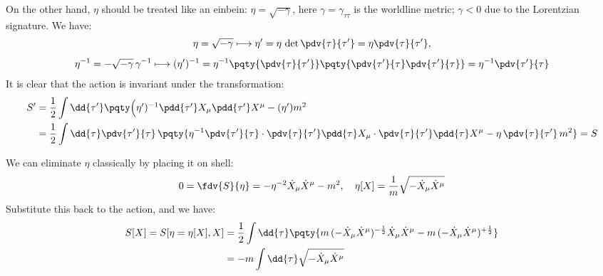 \documentclass[a4paper,10pt]{article}
\begin{document}
	On the other hand, $\eta$ should be treated like an einbein: $\eta = \sqrt{-\gamma}$, here $\gamma = \gamma_{\tau\tau}$ is the worldline metric; $\gamma < 0$ due to the Lorentzian signature. We have:
	\begin{gather}
		\eta = \sqrt{-\gamma}
		\longmapsto \eta' = \eta\,
			\det \pdv{\tau}{\tau'}
		= \eta \pdv{\tau}{\tau'},
	\\[1ex]
		\eta^{-1}
		= - \sqrt{-\gamma}\,\gamma^{-1}
		\longmapsto (\eta')^{-1} = \eta^{-1}
			\pqty{\pdv{\tau}{\tau'}}
			\pqty{
				\pdv{\tau'}{\tau}
				\pdv{\tau'}{\tau}
			}
		= \eta^{-1} \pdv{\tau'}{\tau}
	\end{gather}
	It is clear that the action is invariant under the transformation:
	\begin{equation}
	\begin{aligned}
		S'
		&= \frac{1}{2} \int \dd{\tau'} \pqty\Big{
				(\eta')^{-1}
					\pdd{\tau'} X_\mu
					\pdd{\tau'} X^\mu
				- (\eta') m^2
			} \\
		&= \frac{1}{2} \int \dd{\tau}
			\pdv{\tau'}{\tau}\,
			\pqty{
				\eta^{-1}
					\pdv{\tau'}{\tau}
					\cdot
					\pdv{\tau}{\tau'}
					\pdd{\tau} X_\mu
					\cdot
					\pdv{\tau}{\tau'}
					\pdd{\tau} X^\mu
				- \eta\,\pdv{\tau}{\tau'}\,m^2
			} = S
	\end{aligned}
	\end{equation}
	
	We can eliminate $\eta$ classically by placing it on shell:
	\begin{equation}
		0 = \fdv{S}{\eta}
		= - \eta^{-2} \dot{X}_\mu \dot{X}^\mu
			- m^2,
	\quad
		\eta[X] = \frac{1}{m}
			\sqrt{-\dot{X}_\mu \dot{X}^\mu}
	\end{equation}
	Substitute this back to the action, and we have:
	\begin{equation}
	\begin{aligned}
		S[X] = S[\eta = \eta[X], X]
		&= \frac{1}{2} \int \dd{\tau} \pqty{
				m\,(
					-\dot{X}_\mu \dot{X}^\mu
				)^{-\frac{1}{2}}
				\dot{X}_\mu \dot{X}^\mu
				- m\,(
					-\dot{X}_\mu \dot{X}^\mu
				)^{+\frac{1}{2}}
			} \\
		&= -m \int \dd{\tau}
			\sqrt{-\dot{X}_\mu \dot{X}^\mu}
	\end{aligned}
	\end{equation}
\end{document}
